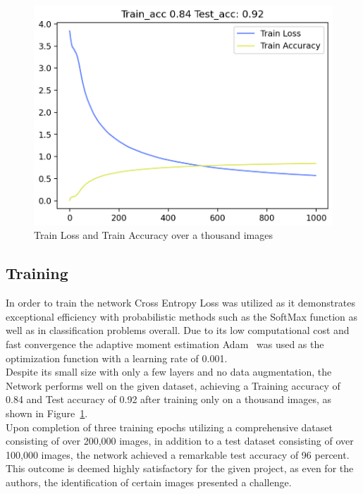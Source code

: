 \documentclass[@CLASSOPTIONS@]{tumarticle}
\begin{document}
\begin{figure}
    \begin{minipage}{0.48\textwidth}
     \centering
     \includegraphics[width=.9\linewidth]{figures/train_plot}
     \caption{Train Loss and Train Accuracy over a thousand images}\label{Fig:tp}
   \end{minipage}
\end{figure}

\subsection{Training}

In order to train the network Cross Entropy Loss was utilized as it demonstrates exceptional efficiency with probabilistic
methods such as the SoftMax function as well as in classification problems overall.
Due to its low computational cost and fast convergence the adaptive moment estimation Adam~\cite{Adam} was used as the optimization
function with a learning rate of 0.001.\\
Despite its small size with only a few layers and no data augmentation, the Network performs well on the given dataset,
achieving a Training accuracy of 0.84 and Test accuracy of 0.92 after training only on a thousand images, as shown in
Figure~\ref{Fig:tp}.\\
Upon completion of three training epochs utilizing a comprehensive dataset consisting of over 200,000 images, in
addition to a test dataset consisting of over 100,000 images, the network achieved a remarkable test accuracy of 96 percent.
This outcome is deemed highly satisfactory for the given project, as even for the authors, the identification of certain
images presented a challenge.\\
\end{document}
